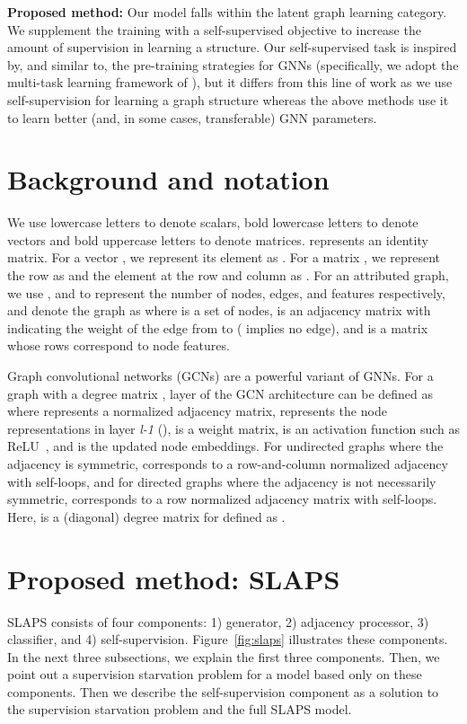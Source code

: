 \documentclass{article}
\begin{document}
\textbf{Proposed method:} Our model falls within the latent graph learning category. 
We supplement the training with a self-supervised objective to increase the amount of supervision in learning a structure. 
Our self-supervised task is inspired by, and similar to, the pre-training strategies for GNNs \citep{hu2020strategies,hu2020gpt,jin2020self,you2020does,zhu2020self} (specifically, we adopt the multi-task learning framework of \citet{you2020does}), but it differs from this line of work as we use self-supervision for learning a graph structure whereas the above methods use it to learn better (and, in some cases, transferable) GNN parameters. 

\section{Background and notation} \label{sec:background}
We use lowercase letters to denote scalars, bold lowercase letters to denote vectors and bold uppercase letters to denote matrices.  represents an identity matrix. For a vector , we represent its  element as . For a matrix , we represent the  row as  and the element at the  row and  column as . For an attributed graph, we use ,  and  to represent the number of nodes, edges, and features respectively, and denote the graph as  where  is a set of nodes,  is an adjacency matrix with  indicating the weight of the edge from  to  ( implies no edge), and  is a matrix whose rows correspond to node features. 

Graph convolutional networks (GCNs) \cite{kipf2017semi} are a powerful variant of GNNs. For a graph  with a degree matrix , layer  of the GCN architecture can be defined as  where  represents a normalized adjacency matrix,  represents the node representations in layer \emph{l-1} (),  is a weight matrix,  is an activation function such as ReLU~\cite{relu}, and  is the updated node embeddings. For undirected graphs where the adjacency is symmetric,    corresponds to a row-and-column normalized adjacency with self-loops, and for directed graphs where the adjacency is not necessarily symmetric,  corresponds to a row normalized adjacency matrix with self-loops. Here,  is a (diagonal) degree matrix for  defined as .

\section{Proposed method: SLAPS}
SLAPS consists of four components: 1) generator, 2) adjacency processor, 3) classifier, and 4) self-supervision. 
Figure~\ref{fig:slaps} illustrates these components. In the next three subsections, we explain the first three components. Then, we point out a supervision starvation problem for a model based only on these components. Then we describe the self-supervision component as a solution to the supervision starvation problem and the full SLAPS model.
\end{document}
